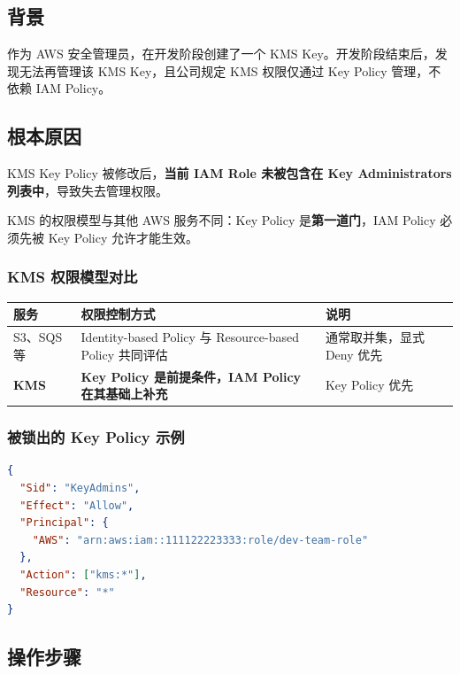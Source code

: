 \documentclass[12pt, a4paper]{article}
\begin{document}
\subsection{背景}

作为 AWS 安全管理员，在开发阶段创建了一个 KMS Key。开发阶段结束后，发现无法再管理该 KMS Key，且公司规定 KMS 权限仅通过 Key Policy 管理，不依赖 IAM Policy。

\subsection{根本原因}

\begin{rootcause}
KMS Key Policy 被修改后，\textbf{当前 IAM Role 未被包含在 Key Administrators 列表中}，导致失去管理权限。

KMS 的权限模型与其他 AWS 服务不同：Key Policy 是\textbf{第一道门}，IAM Policy 必须先被 Key Policy 允许才能生效。
\end{rootcause}

\subsubsection{KMS 权限模型对比}

\begin{center}
\begin{tabular}{lp{6cm}p{4cm}}
\toprule
\textbf{服务} & \textbf{权限控制方式} & \textbf{说明} \\
\midrule
S3、SQS 等 & Identity-based Policy 与 Resource-based Policy 共同评估 & 通常取并集，显式 Deny 优先 \\
\textbf{KMS} & \textbf{Key Policy 是前提条件，IAM Policy 在其基础上补充} & Key Policy 优先 \\
\bottomrule
\end{tabular}
\end{center}

\subsubsection{被锁出的 Key Policy 示例}

\begin{lstlisting}[language=json, caption=错误的 Key Policy（管理员角色不含当前用户）]
{
  "Sid": "KeyAdmins",
  "Effect": "Allow",
  "Principal": {
    "AWS": "arn:aws:iam::111122223333:role/dev-team-role"
  },
  "Action": ["kms:*"],
  "Resource": "*"
}
\end{lstlisting}

\subsection{操作步骤}
\end{document}
